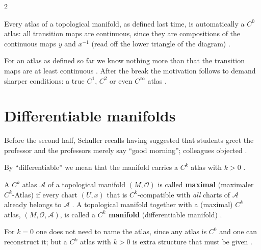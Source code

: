 \begin{paracol}{2}
\begin{theorem}\label{thm:dm-c0}
Every atlas of a topological manifold, as defined last time, is automatically a $C^0$ atlas: all transition maps are
continuous, since they are compositions of the continuous maps $y$ and $x^{-1}$ (read off the lower triangle of the diagram)
.
\end{theorem}
For an atlas as defined so far we know nothing more than that the transition maps are at least continuous
. After the break the motivation follows to demand sharper conditions: a true $C^1$, $C^2$
or even $C^\infty$ atlas .

\section{Differentiable manifolds}\label{sec:dm-diffmfd}

\begin{aside}[Greetings]
Before the second half, Schuller recalls having suggested that students greet the professor and the professors merely
say ``good morning''; colleagues objected .
\end{aside}

By ``differentiable'' we mean that the manifold carries a $C^k$ atlas with $k>0$ .

\begin{definition}\label{def:dm-ckmanifold}
A $C^k$ atlas $\mathcal A$ of a topological manifold $(M,\mathcal O)$ is called \textbf{maximal} (maximaler $C^k$-Atlas) if every
chart $(U,x)$ that is $C^k$-compatible with \emph{all} charts of $\mathcal A$ already belongs to $\mathcal A$
.
A topological manifold together with a (maximal) $C^k$ atlas, $(M,\mathcal O,\mathcal A)$, is called a
\textbf{$C^k$ manifold} (differentiable manifold) .
\end{definition}
For $k=0$ one does not need to name the atlas, since any atlas is $C^0$ and one can reconstruct it; but a $C^k$ atlas with
$k>0$ is extra structure that must be given .


\end{paracol}
